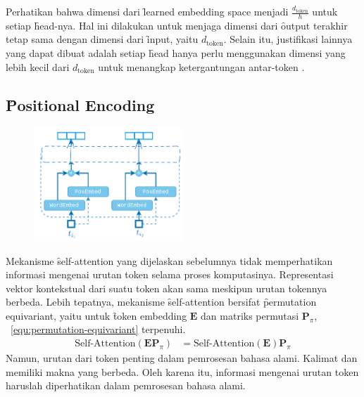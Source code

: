 	Perhatikan bahwa dimensi dari \f{learned embedding space} menjadi $\frac{d_{\text{token}}}{h}$ untuk setiap \f{head}-nya. Hal ini dilakukan untuk menjaga dimensi dari \f{output} terakhir tetap sama dengan dimensi dari \f{input}, yaitu $d_{\text{token}}$. Selain itu, justifikasi lainnya yang dapat dibuat adalah setiap \f{head} hanya perlu menggunakan dimensi yang lebih kecil dari $d_{\text{token}}$ untuk menangkap ketergantungan antar-token \citep{pi-tau2023transformer}.

	\subsection{\f{Positional Encoding}}
	\label{sec:positional-encoding}

	\begin{figure}[!ht]
		\centering
		\includegraphics[width=0.5\textwidth]{assets/pics/positional_encoding.png}
		\label{fig:positional-encoding}
	\end{figure}


	Mekanisme \f{self-attention} yang dijelaskan sebelumnya tidak memperhatikan informasi mengenai urutan token selama proses komputasinya. Representasi vektor kontekstual dari suatu token akan sama meskipun urutan tokennya berbeda. Lebih tepatnya, mekanisme \f{self-attention} bersifat \f{permutation equivariant}, yaitu untuk \f{token embedding} $\mathbf{E}$ dan matriks permutasi $\mathbf{P}_{\pi}$, \equ~\ref{equ:permutation-equivariant} terpenuhi.
	\begin{align}
	\label{equ:permutation-equivariant}
	\text{Self-Attention}(\mathbf{EP}_{\pi}) &= \text{Self-Attention}(\mathbf{E})\mathbf{P}_{\pi}
	\end{align}
	Namun, urutan dari token penting dalam pemrosesan bahasa alami. Kalimat  dan  memiliki makna yang berbeda. Oleh karena itu, informasi mengenai urutan token haruslah diperhatikan dalam pemrosesan bahasa alami.
	
